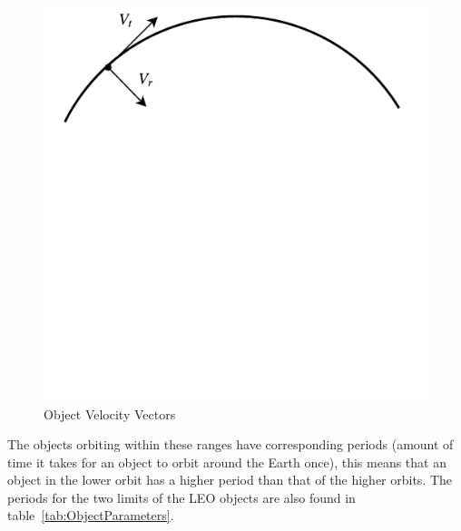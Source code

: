 \documentclass[11pt]{witseiepaper}
\begin{document}
\begin{center}
    \begin{figure}
        \includegraphics[width=\textwidth]{Vectors.pdf}
        \caption{Object Velocity Vectors}
        \label{fig:ObjectVelocityVectors}    
    \end{figure}
\end{center}

The objects orbiting within these ranges have corresponding periods (amount of time it takes for an object to orbit around the Earth once), this means that an object in the lower orbit has a higher period than that of the higher orbits. The periods for the two limits of the LEO objects are also found in table~\ref{tab:ObjectParameters}.
\end{document}
